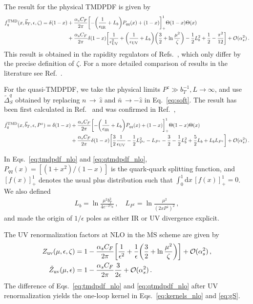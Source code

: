 \documentclass[prd,aps,twocolumn,bibnotes,nofootinbib,preprintnumbers,floatfix]{revtex4-1}
\DeclareRobustCommand{\eq}[1]{Eq.~\eqref{eq:#1}}
\DeclareRobustCommand{\eqs}[2]{Eqs.~\eqref{eq:#1} and \eqref{eq:#2}}
\DeclareRobustCommand{\mycite}[1]{Ref.~\cite{#1}}
\DeclareRobustCommand{\mycites}[1]{Refs.~\cite{#1}}
\newcommand{\df}{\mathrm{d}}
\newcommand{\eps}{\epsilon}
\newcommand{\cO}{\mathcal{O}}
\newcommand{\nn}{\nonumber}
\newcommand{\bn}{{\bar{n}}}
\newcommand{\as}{\alpha_s}
\newcommand{\bt}{\vec b_T}
\newcommand{\MS}{\overline{\mathrm{MS}}}
\newcommand\TMD{\mathrm{TMD}}
\begin{document}
\begin{widetext}
The result for the physical TMDPDF is given by
\begin{align} \label{eq:tmdpdf_nlo}
 f_q^{\TMD}(x, \bt, \eps, \zeta)
 = \delta(1-x) &+ \frac{\as C_F}{2\pi} \biggl[ - \biggl(\frac{1}{\eps_{\rm IR}} + L_b\biggr) P_{qq}(x) +  (1-x) \biggr]_+^1\Theta(1-x)\Theta(x)
 \\*\nn&
  + \frac{\as C_F}{2\pi} \delta(1-x) \biggl[ \frac{1}{\eps_{\rm UV}^2}
   + \biggl(\frac{1}{\eps_{\rm UV}} + L_b\biggr) \biggl(\frac{3}{2} + \ln\frac{\mu^2}{\zeta} \biggr)
   - \frac{1}{2} L_b^2  + \frac{1}{2} - \frac{\pi^2}{12} \biggr]
  + \cO(\as^2)
\,.\end{align}
This result is obtained in the rapidity regulators of \mycites{Collins:1350496,Becher:2010tm,Becher:2011dz,Chiu:2011qc,Chiu:2012ir,GarciaEchevarria:2011rb,Li:2016axz},
which only differ by the precise definition of $\zeta$.
For a more detailed comparison of results in the literature see \mycite{Ebert:2019okf}.

For the quasi-TMDPDF, we take the physical limits $P^z\gg b_T^{-1},L\to\infty$, and use $\tilde\Delta_S^q$ obtained by replacing $n\,{\to}\,\hat z$ and $\bn\,{\to}-\!\hat z$ in \eq{soft}.
The result has been first calculated in \mycite{Ji:2018hvs} and was confirmed in \mycite{Ebert:2019okf},
\begin{align} \label{eq:qtmdpdf_nlo}
 \tilde f_{q}^{\TMD}(x,\bt,\eps,P^z)
 = \delta(1-x)
   &+ \frac{\as C_F}{2\pi} \biggl[ - \biggl(\frac{1}{\eps_{\rm IR}} + L_b \biggr) P_{qq}(x) +  (1-x) \biggr]_+^1 \Theta(1-x)\Theta(x)
 \\*\nn&
   + \frac{\as C_F}{2\pi} \delta(1-x) \biggl[ \frac{3}{2} \frac{1}{\eps_{\rm UV}}
   - \frac{1}{2} L_{P^z}^2 - L_{P^z} - \frac{3}{2}
   - \frac{1}{2} L_b^2 + \frac{5}{2} L_b + L_b L_{P^z} \biggr]
 + \cO(\as^2)
\,.\end{align}
\end{widetext}
In \eqs{tmdpdf_nlo}{qtmdpdf_nlo}, $P_{qq}(x) = [(1+x^2)/(1-x)]$ is the quark-quark splitting function,
and $[f(x)]_+^1$ denotes the usual plus distribution such that $\int_0^1 \df x \, [f(x)]_+^1 = 0$.
We also defined
\begin{align}
 L_b = \ln\frac{\mu^2 b_T^2}{4 e^{-2\gamma_E}}
\,,\quad
 L_{P^z} = \ln\frac{\mu^2}{(2 x P^z)^2}
\,,\end{align}
and made the origin of $1/\epsilon$ poles as either IR or UV divergence explicit.

The UV renormalization factors at NLO in the $\MS$ scheme are given by
\begin{align}
 Z_{\rm uv}(\mu, \eps, \zeta) &= 1 - \frac{\as C_F}{2\pi} \biggl[ \frac{1}{\eps^2}
   + \frac{1}{\eps} \biggl(\frac{3}{2} + \ln\frac{\mu^2}{\zeta} \biggr)\biggr]
   + \cO(\as^2)
\,,\nn\\*
 \tilde Z_{\rm uv}(\mu, \eps) &= 1 - \frac{\as C_F}{2\pi} \frac{3}{2\eps}
 + \cO(\as^2)
\,.\end{align}
The difference of \eqs{tmdpdf_nlo}{qtmdpdf_nlo} after UV renormalization
yields the one-loop kernel in \eqs{kernels_nlo}{gS}.

\clearpage

\end{document}
